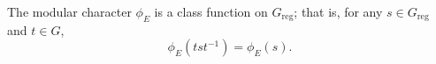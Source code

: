 The modular character $\phi_E$ is a class function on $G_{\text{reg}}$; that is, for any $s \in G_{\text{reg}}$ and $t \in G$,
$$\phi_E(t s t^{-1}) = \phi_E(s).$$
